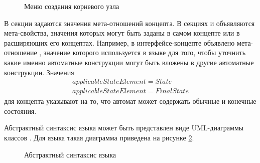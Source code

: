 \begin{itemize}
\begin{figure}
 \centering
 \caption{Меню создания корневого узла}
 \label{fig:CreateStateMachine}
\end{figure}

В секции  задаются значения мета-отношений концепта. В секциях  и  объявляются мета-свойства, значения которых могут быть заданы в самом концепте или в расширяющих его концептах. Например, в интерфейсе-концепте  объявлено мета-отношение , значение которого используется в языке  для того, чтобы уточнить какие именно автоматные конструкции могут быть вложены в другие автоматные конструкции. Значения
$$
\begin{array}{l}
applicableStateElement = State\\
applicableStateElement = FinalState
\end{array}
$$
для концепта  указывают на то, что автомат может содержать обычные и конечные состояния.
\end{itemize}

Абстрактный синтаксис языка может быть представлен виде UML-диаграммы классов \cite{uml}. Для языка  такая диаграмма приведена на рисунке \ref{fig:AbstractSyntax}.

\begin{figure}
 \centering
 \caption{Абстрактный синтаксис языка }
 \label{fig:AbstractSyntax}
\end{figure}
